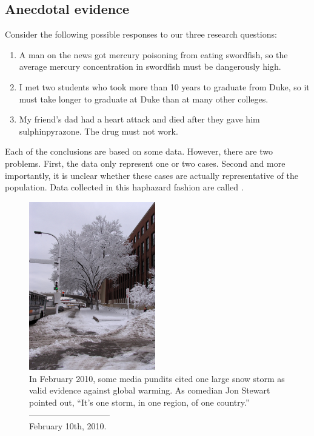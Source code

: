 \subsection{Anecdotal evidence}

Consider the following possible responses to our three research questions:
\begin{enumerate}
\item A man on the news got mercury poisoning from eating swordfish, so the average mercury concentration in swordfish must be dangerously high.
\item\label{iKnowThreeStudentsWhoTookMoreThan10YearsToGraduateAtUCLA} I met two students who took more than 10 years to graduate from Duke, so it must take longer to graduate at Duke than at many other colleges.
\item\label{myFriendsDadDiedAfterSulphinpyrazon} My friend's dad had a heart attack and died after they gave him sulphinpyrazone. The drug must not work. 
\end{enumerate}
Each of the conclusions are based on some data. However, there are two problems. First, the data only represent one or two cases. Second and more importantly, it is unclear whether these cases are actually representative of the population. Data collected in this haphazard fashion are called .
\setlength{\captionwidth}{\textwidth-64mm}
\begin{figure}
\begin{centering}
\includegraphics[width=55mm]{01/figures/mnWinter/mnWinter}\hspace{4mm}
\begin{minipage}[b]{\textwidth - 64mm}
   \caption[anecdotal evidence]{In February 2010, some media pundits cited one large snow storm as valid evidence against global warming. As comedian Jon Stewart pointed out, ``It's one storm, in one region, of one country.''\vspace{-4.5mm} \\
   
   -----------------------------\vspace{-2mm}\\
   {\footnotesize February 10th, 2010.}
   \label{mnWinter}}
\end{minipage}
\end{centering}
\end{figure}
\setlength{\captionwidth}{\mycaptionwidth}

